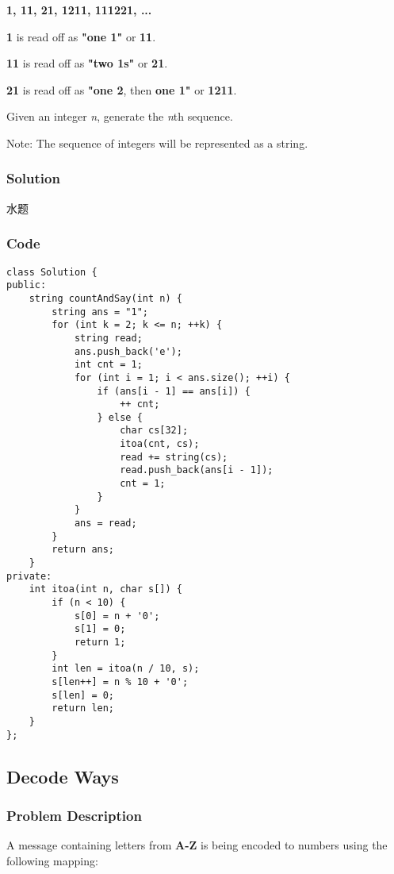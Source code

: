 \documentclass[courier]{article}
\begin{document}
\begin{CJK*}{UTF8}{gkai}
\textbf{1, 11, 21, 1211, 111221, ...}

\textbf{1} is read off as \textbf{"one 1"} or \textbf{11}.


\textbf{11} is read off as \textbf{"two 1s"} or \textbf{21}.


\textbf{21} is read off as \textbf{"one 2}, then \textbf{one 1"} or \textbf{1211}.

Given an integer \emph{n}, generate the \emph{n}th sequence.

Note: The sequence of integers will be represented as a string.



\subsubsection*{Solution}
水题

\subsubsection*{Code}
\begin{lstlisting}
class Solution {
public:
    string countAndSay(int n) {
        string ans = "1";
        for (int k = 2; k <= n; ++k) {
            string read;
            ans.push_back('e');
            int cnt = 1;
            for (int i = 1; i < ans.size(); ++i) {
                if (ans[i - 1] == ans[i]) {
                    ++ cnt;
                } else {
                    char cs[32];
                    itoa(cnt, cs);
                    read += string(cs);
                    read.push_back(ans[i - 1]);
                    cnt = 1;
                }
            }
            ans = read;
        }
        return ans;
    }
private:
    int itoa(int n, char s[]) {
        if (n < 10) {
            s[0] = n + '0';
            s[1] = 0;
            return 1;
        }
        int len = itoa(n / 10, s);
        s[len++] = n % 10 + '0';
        s[len] = 0;
        return len;
    }
}; 
\end{lstlisting}


\subsection{ Decode Ways }

\subsubsection*{Problem Description}
A message containing letters from \textbf{A-Z} is being encoded to numbers using the following mapping:


\end{CJK*}
\end{document}
